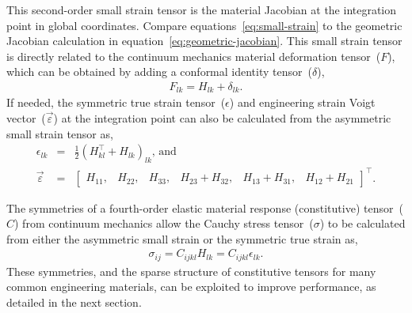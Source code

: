\documentclass[]             %
{NASA}                       %
\begin{document}
This second-order small strain tensor is the material Jacobian at the integration
 point in global coordinates.
 Compare equations~\ref{eq:small-strain} to the geometric Jacobian calculation in equation~\ref{eq:geometric-jacobian}.
 This small strain tensor is directly related to the continuum mechanics
 material deformation tensor~($F$), which can be obtained by adding a conformal identity tensor~($\delta$), 
\begin{eqnarray}
F_{lk} = H_{lk}+\delta_{lk}\text{.}
\end{eqnarray}
If needed, the symmetric true strain tensor~($\epsilon$)
 and engineering strain Voigt vector~($\vec{\varepsilon}$) at the integration point can also
 be calculated from the asymmetric small strain tensor as,
\begin{eqnarray}
\epsilon_{lk} & = & \tfrac{1}{2}(H^{\top}_{kl}+H_{lk})_{lk}\text{, and}\label{eq:true-strain-from-unsymm-strain}\\
\vec{\varepsilon} & = & \left[\begin{array}{cccccc}
H_{11}, & H_{22}, & H_{33}, & H_{23}+H_{32}, & H_{13}+H_{31}, & H_{12}+H_{21}\end{array}\right]^{\top}\text{.}\label{eq:engineering-strain-from unsymm-strain}
\end{eqnarray}

The symmetries of a fourth-order elastic material response (constitutive)
 tensor~($C$) from continuum mechanics allow the Cauchy stress tensor~($\sigma$) to be calculated
 from either the asymmetric small strain or the symmetric true strain as,
\begin{eqnarray}
\sigma_{ij} = C_{ijkl} H_{lk} = C_{ijkl} \epsilon_{lk}\text{.}\label{eq:tensor-stress-from-strain}
\end{eqnarray}
These symmetries, and the sparse structure of constitutive tensors for many
 common engineering materials, can be exploited to improve performance,
 as detailed in the next section.%
 
\end{document}
